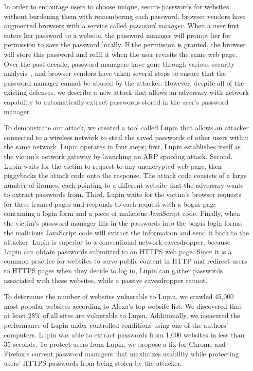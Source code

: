 \documentclass[letterpaper,twocolumn,10pt]{article}
\begin{document}
In order to encourage users to choose unique, secure passwords for 
websites without burdening them with remembering each password, 
browser vendors have augmented browsers with a service called 
\emph{password manager}. When a user first enters her password to a 
website, the password manager will prompt her for permission to 
save the password locally. If the 
permission is granted, the browser will store this password and 
refill it when the user revisits the same web page. Over the past 
decade, password managers have gone through various security 
analysis~\cite{passhash,passpet}, and browser vendors have taken several 
steps to ensure that the password manager cannot be abused by the 
attacker. However, despite all of the existing defenses,
we describe a new attack that allows 
an adversary with network capability to automatically extract 
passwords stored in the user's password manager. 

To demonstrate our attack, we created a tool called Lupin that allows an attacker 
connected to a wireless network to steal the saved passwords of other 
users within the same network. Lupin operates in four steps; first, 
Lupin establishes itself as the victim's network gateway by launching 
an ARP spoofing attack. Second, Lupin waits for the victim to
request to any unencrypted web page, then piggybacks the attack code 
onto the response. The attack code consists of a large number of 
iframes, each pointing to a different website that the adversary wants 
to extract passwords from. Third, Lupin waits for the victim's browser 
requests for these framed pages and responds to each request with a 
bogus page containing a login form and a piece of malicious JavaScript 
code. Finally, when the victim's password manager fills in the 
passwords into the bogus login forms, the malicious JavaScript code 
will extract the information and send it back to the attacker. 
Lupin is superior to a conventional network eavesdropper, because
Lupin can obtain passwords submitted to an HTTPS web page. 
Since it is a common practice 
for websites to serve public content in HTTP and redirect users to 
HTTPS pages when they decide to log in, Lupin can gather passwords 
associated with these websites, while a passive eavesdropper cannot. 

To determine the number of websites vulnerable to Lupin, we crawled 
45,000 most popular websites according to Alexa's top website list. 
We discovered that at least 28\% of all sites are vulnerable to Lupin. 
Additionally, we measured the performance of Lupin under controlled 
conditions using one of the authors' computers. Lupin was able to 
extract passwords from 1,000 websites in less than 35 seconds. To 
protect users from Lupin, we propose a fix for Chrome and Firefox's 
current password managers that maximizes usability while protecting 
users' HTTPS passwords from being stolen by the attacker.
\end{document}
